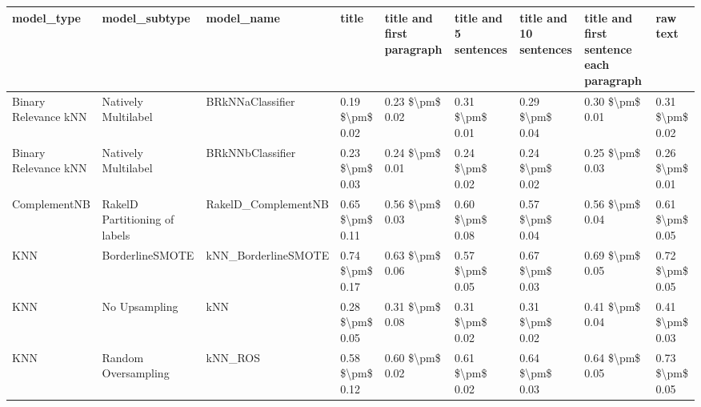 \begin{tabular}{lllllllll}
\toprule
                     model\_type &                 model\_subtype &                                   model\_name &               title & title and first paragraph & title and 5 sentences & title and 10 sentences & title and first sentence each paragraph &        raw text \\
\midrule
           Binary Relevance kNN &           Natively Multilabel &                             BRkNNaClassifier &     0.19 \$\textbackslash pm\$ 0.02 &           0.23 \$\textbackslash pm\$ 0.02 &       0.31 \$\textbackslash pm\$ 0.01 &        0.29 \$\textbackslash pm\$ 0.04 &                         0.30 \$\textbackslash pm\$ 0.01 & 0.31 \$\textbackslash pm\$ 0.02 \\
           Binary Relevance kNN &           Natively Multilabel &                             BRkNNbClassifier &     0.23 \$\textbackslash pm\$ 0.03 &           0.24 \$\textbackslash pm\$ 0.01 &       0.24 \$\textbackslash pm\$ 0.02 &        0.24 \$\textbackslash pm\$ 0.02 &                         0.25 \$\textbackslash pm\$ 0.03 & 0.26 \$\textbackslash pm\$ 0.01 \\
                   ComplementNB & RakelD Partitioning of labels &                          RakelD\_ComplementNB &     0.65 \$\textbackslash pm\$ 0.11 &           0.56 \$\textbackslash pm\$ 0.03 &       0.60 \$\textbackslash pm\$ 0.08 &        0.57 \$\textbackslash pm\$ 0.04 &                         0.56 \$\textbackslash pm\$ 0.04 & 0.61 \$\textbackslash pm\$ 0.05 \\
                            KNN &               BorderlineSMOTE &                          kNN\_BorderlineSMOTE &     0.74 \$\textbackslash pm\$ 0.17 &           0.63 \$\textbackslash pm\$ 0.06 &       0.57 \$\textbackslash pm\$ 0.05 &        0.67 \$\textbackslash pm\$ 0.03 &                         0.69 \$\textbackslash pm\$ 0.05 & 0.72 \$\textbackslash pm\$ 0.05 \\
                            KNN &                 No Upsampling &                                          kNN &     0.28 \$\textbackslash pm\$ 0.05 &           0.31 \$\textbackslash pm\$ 0.08 &       0.31 \$\textbackslash pm\$ 0.02 &        0.31 \$\textbackslash pm\$ 0.02 &                         0.41 \$\textbackslash pm\$ 0.04 & 0.41 \$\textbackslash pm\$ 0.03 \\
                            KNN &           Random Oversampling &                                      kNN\_ROS &     0.58 \$\textbackslash pm\$ 0.12 &           0.60 \$\textbackslash pm\$ 0.02 &       0.61 \$\textbackslash pm\$ 0.02 &        0.64 \$\textbackslash pm\$ 0.03 &                         0.64 \$\textbackslash pm\$ 0.05 & 0.73 \$\textbackslash pm\$ 0.05 \\

\end{tabular}
